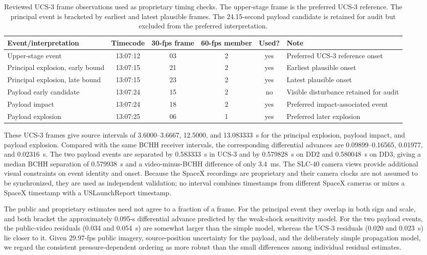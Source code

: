 \documentclass[]{seismica}
\begin{document}
\begin{table}[!tbp]
\centering
\caption{Reviewed UCS-3 frame observations used as proprietary timing checks.
The upper-stage frame is the preferred UCS-3 reference. The principal event is
bracketed by earliest and latest plausible frames. The 24.15-second payload
candidate is retained for audit but excluded from the preferred interpretation.}
\label{tab:supp_uc3_frames}
\begin{tabularx}{\textwidth}{XccccX}
\hline
Event/interpretation & Timecode & 30-fps frame & 60-fps member & Used? & Note \\
\hline
Upper-stage event & 13:07:12 & 03 & 2 & yes & Preferred UCS-3 reference onset \\
Principal explosion, early bound & 13:07:15 & 21 & 2 & yes & Earliest plausible onset \\
Principal explosion, late bound & 13:07:15 & 23 & 2 & yes & Latest plausible onset \\
Payload early candidate & 13:07:24 & 15 & 2 & no & Visible disturbance retained for audit \\
Payload impact & 13:07:24 & 18 & 2 & yes & Preferred impact-associated event \\
Payload explosion & 13:07:25 & 06 & 1 & yes & Preferred later explosion \\
\hline
\end{tabularx}
\end{table}

These UCS-3 frames give source intervals of 3.6000--3.6667, 12.5000, and
13.083333~s for the principal explosion, payload impact, and payload explosion.
Compared with the same BCHH receiver intervals, the corresponding differential
advances are 0.09899--0.16565, 0.01977, and 0.02316~s. The two payload events
are separated by 0.583333~s in UCS-3 and by 0.579828~s on DD2 and
0.580048~s on DD3, giving a median BCHH separation of 0.579938~s and a
video-minus-BCHH difference of only 3.4~ms. The SLC-40 camera views provide
additional visual constraints on event identity and onset. Because the SpaceX
recordings are proprietary and their camera clocks are not assumed to be
synchronized, they are used as independent validation; no interval combines
timestamps from different SpaceX cameras or mixes a SpaceX timestamp with a
USLaunchReport timestamp.

The public and proprietary estimates need not agree to a fraction of a frame.
For the principal event they overlap in both sign and scale, and both bracket
the approximately 0.095-s differential advance predicted by the weak-shock
sensitivity model. For the two payload events, the public-video residuals
(0.034 and 0.054~s) are somewhat larger than the simple model, whereas the
UCS-3 residuals (0.020 and 0.023~s) lie closer to it. Given 29.97-fps public
imagery, source-position uncertainty for the payload, and the deliberately
simple propagation model, we regard the consistent pressure-dependent ordering
as more robust than the small differences among individual residual estimates.
\end{document}

